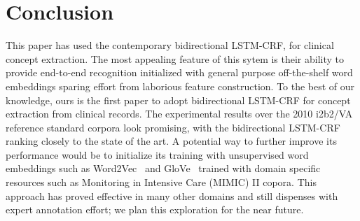 \documentclass[11pt]{article}
\begin{document}
\label{sec:length}

\section*{Conclusion}

This paper has used the contemporary bidirectional LSTM-CRF, for clinical concept extraction. The most appealing feature of this sytem   is their ability to provide end-to-end recognition initialized with general purpose off-the-shelf word embeddings sparing effort from laborious feature construction. To the best of our knowledge, ours is the first paper to adopt bidirectional LSTM-CRF for concept extraction from clinical records. The experimental results over the  2010 i2b2/VA reference standard corpora look promising, with the bidirectional LSTM-CRF ranking closely to the state of the art. A potential way to further improve its performance would be to initialize its training with unsupervised word embeddings such as Word2Vec~\cite{Mikolov:13} and GloVe~\cite{Pennington:14} trained with domain specific resources such as Monitoring in Intensive Care (MIMIC) II copora. This approach has proved effective in many other domains and still dispenses with expert annotation effort; we plan this exploration for the near future. 



\end{document}
